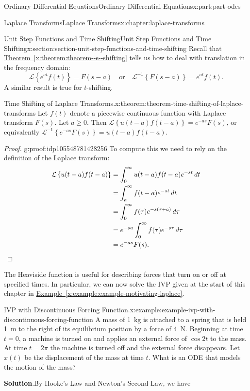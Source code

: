 \documentclass[oneside,10pt,]{book}
\newcommand{\blocktitlefont}{\relax}
\newcommand{\xreffont}{\relax}
\numberwithin{equation}{part}
\newcommand{\qedhere}{\relax}
\newcommand{\Laplace}[1]{\mathcal{L}\left\{#1\right\}}
\newcommand{\iLaplace}[1]{\mathcal{L}^{-1}\left\{#1\right\}}
\newcommand{\amp}{&}
\begin{document}
\begin{partptx}{Ordinary Differential Equations}{}{Ordinary Differential Equations}{}{}{x:part:part-odes}
\begin{chapterptx}{Laplace Transforms}{}{Laplace Transforms}{}{}{x:chapter:laplace-transforms}
\begin{sectionptx}{Unit Step Functions and Time Shifting}{}{Unit Step Functions and Time Shifting}{}{}{x:section:section-unit-step-functions-and-time-shifting}
Recall that \hyperref[x:theorem:theorem--s--shifting]{Theorem~{\xreffont\ref{x:theorem:theorem--s--shifting}}} tells us how to deal with translation in the frequency domain:%
\begin{equation*}
\Laplace{e^{at}f(t)} = F(s-a) \quad\text{or}\quad\iLaplace{F(s-a)} = e^{at}f(t).
\end{equation*}
A similar result is true for \(t\)-shifting.%
\begin{theorem}{Time Shifting of Laplace Transforms.}{}{x:theorem:theorem-time-shifting-of-laplace-transforms}%
Let \(f(t)\) denote a piecewise continuous function with Laplace transform \(F(s)\). Let \(a\geq0\). Then \(\Laplace{u(t-a)f(t-a)} = e^{-as}F(s)\), or equivalently \(\iLaplace{e^{-as}F(s)} = u(t-a)f(t-a)\).%
\end{theorem}
\begin{proof}{}{g:proof:idp105548781428256}
To compute this we need to rely on the definition of the Laplace transform:%
\begin{align*}
\Laplace{u(t-a)f(t-a)} \amp= \int_{0}^{\infty}u(t-a)f(t-a)e^{-st}\,dt\\
\amp= \int_{a}^{\infty}f(t-a)e^{-st}\,dt\\
\amp= \int_{0}^{\infty}f(\tau)e^{-s(\tau+a)}\,d\tau\\
\amp= e^{-sa}\int_{0}^{\infty}f(\tau)e^{-s\tau}\,d\tau\\
\amp= e^{-as}F(s)\text{.}\qedhere
\end{align*}
%
\end{proof}
The Heaviside function is useful for describing forces that turn on or off at specified times. In particular, we can now solve the IVP given at the start of this chapter in \hyperref[x:example:example-motivating-laplace]{Example~{\xreffont\ref{x:example:example-motivating-laplace}}}.%
\begin{example}{IVP with Discontinuous Forcing Function.}{x:example:example-ivp-with-discontinuous-forcing-function}%
A mass of \SI{1}{\kilogram} is attached to a spring that is held \SI{1}{\meter} to the right of its equilibrium position by a force of \SI{4}{\newton}. Beginning at time \(t=0\), a machine is turned on and applies an external force of \(\cos2t\) to the mass. At time \(t=2\pi\) the machine is turned off and the external force disappears. Let \(x(t)\) be the displacement of the mass at time \(t\). What is an ODE that models the motion of the mass?%
\par\smallskip%
\noindent\textbf{\blocktitlefont Solution}.\hypertarget{g:solution:idp105548781370272}{}\quad{}By Hooke's Law and Newton's Second Law, we have%

\end{example}
\end{sectionptx}
\end{chapterptx}
\end{partptx}
\end{document}
